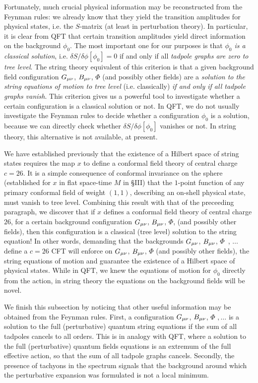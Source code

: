Fortunately, much crucial physical information may be
reconstructed from the Feynman rules: we already know
that they yield the transition amplitudes for
physical states, i.e. the $S$-matrix (at least in
perturbation theory).
In particular, it is clear from QFT that 
certain transition amplitudes yield direct information
on the background $\phi_0$.
The most important one for our purposes is that {\it
$\phi_0$ is a classical solution}, i.e. $\delta
S/\delta\phi[\phi_0]=0$ if and only if all {\it
tadpole graphs are zero to tree level}.
The string theory equivalent of this criterion is that
a given background field configuration ${G_{\mu\nu}}$, ${B_{\mu\nu}}$,
$\Phi$ (and possibly other fields) are a {\it solution
to the string equations of motion to tree level} (i.e.
classically) {\it if and only if all tadpole graphs
vanish}.
This criterion gives us a powerful tool to investigate
whether a certain configuration is a classical
solution or not. 
In QFT, we do not usually investigate the Feynman
rules to decide whether a configuration $\phi_0$ is a
solution, because we can directly check whether
$\delta S/\delta\phi[\phi_0]$ vanishes or not.
In string theory, this alternative is not available,
at present.

We have established previously that the existence
of a Hilbert space of string states requires the map
$x$ to define a conformal field theory of central
charge $c=26$.
It is a simple consequence of conformal invariance on
the sphere (established for $x$ in flat space-time $M$
in \S{III}) that the $1$-point function of any primary
conformal field of weight
$(1,1)$, describing an on-shell physical state,
must vanish to tree level.
Combining this result with that of the preceeding
paragraph, we discover that if $x$ defines a conformal
field theory of central charge $26$, for a certain
background configuration ${G_{\mu\nu}}$, ${B_{\mu\nu}}$, $\Phi$, (and
possibly other fields), then this configuration is a
classical (tree level) solution to the string
equation!
In other words, demanding that the backgrounds ${G_{\mu\nu}}$,
${B_{\mu\nu}}$, $\Phi\,\,\,$, $\ldots$ define a $c=26$ CFT
will enforce on ${G_{\mu\nu}}$, ${B_{\mu\nu}}$, $\Phi$ (and possibly
other fields), 
the string equations of motion and guarantee the
existence of a Hilbert space of physical states.
While in QFT, we knew the equations of motion for
$\phi_0$ directly from the action, in string theory the
equations on the background fields will be novel.

We finish this subsection by noticing that other
useful information may be obtained from the Feynman
rules.
First, a configuration ${G_{\mu\nu}}$, ${B_{\mu\nu}}$,
$\Phi\,\,,\ldots$ is a solution to the full
(perturbative) quantum string equations if the sum of
all tadpoles cancels to all orders.
This is in analogy with QFT, where a solution to the
full (perturbative) quantum fields equations is an
extremum of the full effective action, so that the sum
of all tadpole graphs cancels.
Secondly, the presence of tachyons in the spectrum
signals that the background around which the
perturbative expansion was formulated is not a local
minimum.

